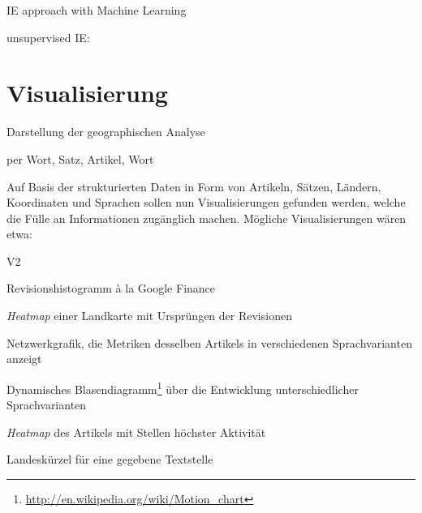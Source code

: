 \begin{todos}
    \item IE approach with Machine Learning 
    \item unsupervised IE: 
\end{todos}



\section{Visualisierung}

\begin{todos}
    \item Darstellung der geographischen Analyse
    \item per Wort, Satz, Artikel, Wort
\end{todos}

Auf Basis der strukturierten Daten in Form von Artikeln, Sätzen, Ländern, Koordinaten und Sprachen sollen nun Visualisierungen gefunden werden, welche die Fülle an Informationen zugänglich machen.
Mögliche Visualisierungen wären etwa:

\begin{labeling}{V2}
\item[V1] Revisionshistogramm à la Google Finance 
\item[V2] \emph{Heatmap} einer Landkarte mit Ursprüngen der Revisionen 
\item[V3] Netzwerkgrafik, die Metriken desselben Artikels in verschiedenen Sprachvarianten anzeigt
\item[V4] Dynamisches Blasendiagramm\footnote{\url{http://en.wikipedia.org/wiki/Motion_chart}} über die Entwicklung unterschiedlicher Sprachvarianten
\item[V5] \emph{Heatmap} des Artikels mit Stellen höchster Aktivität 
\item[V6] Landeskürzel für eine gegebene Textstelle
\end{labeling}

